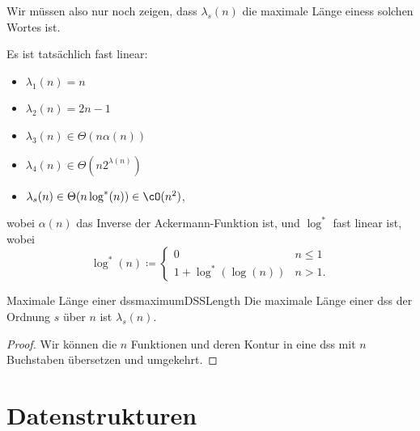 \documentclass[language=ngerman,algolist,acrolist]{TemplateLecture}
\begin{document}
Wir müssen also nur noch zeigen, dass $\lambda_s(n)$ die maximale Länge einess solchen Wortes ist.

Es ist tatsächlich fast linear: 
\begin{itemize}
    \item $\lambda_1(n) = n$
    \item $\lambda_2(n) = 2n - 1$
    \item $\lambda_3(n) \in \Theta(n \alpha(n))$
    \item $\lambda_4(n) \in \Theta(n 2^{\lambda(n)})$
    \item $\lambda_s(n) \in \Theta(n \log^*(n)) \in \cO(n^2)$,
\end{itemize}
wobei $\alpha(n)$ das Inverse der Ackermann-Funktion ist, und $\log^*$ fast linear ist, wobei 
\begin{equation*}
    \log^*(n) \coloneqq \begin{cases}
        0 & n \leq 1 \\
        1 + \log^*(\log(n)) & n > 1.
    \end{cases}
\end{equation*}

\begin{thm}{Maximale Länge einer \ac{dss}}{maximumDSSLength}
    Die maximale Länge einer \ac{dss} der Ordnung $s$ über $n$ ist $\lambda_s(n)$.
\end{thm}

\begin{proof}
    Wir können die $n$ Funktionen und deren Kontur in eine \ac{dss} mit $n$ Buchstaben übersetzen und umgekehrt. 
\end{proof}



\chapter{Datenstrukturen}





\end{document}
